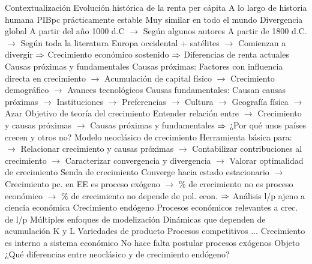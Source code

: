 \documentclass{nuevotema}
\begin{document}
\esquemalargo
















\begin{esquemal}
	\1[] 
		\2 Contextualización
			\3 Evolución histórica de la renta per cápita
				\4 A lo largo de historia humana
				\4[] PIBpc prácticamente estable
				\4[] Muy similar en todo el mundo
				\4 Divergencia global
				\4[] A partir del año 1000 d.C
				\4[] $\to$ Según algunos autores
				\4[] A partir de 1800 d.C.
				\4[] $\to$ Según toda la literatura
				\4[] Europa occidental + satélites
				\4[] $\to$ Comienzan a divergir
				\4[] $\Rightarrow$ Crecimiento económico sostenido
				\4[] $\Rightarrow$ Diferencias de renta actuales
			\3 Causas próximas y fundamentales
				\4 Causas próximas:
				\4[] Factores con influencia directa en crecimiento
				\4[] $\to$ Acumulación de capital físico
				\4[] $\to$ Crecimiento demográfico
				\4[] $\to$ Avances tecnológicos
				\4 Causas fundamentales:
				\4[] Causan causas próximas
				\4[] $\to$ Instituciones
				\4[] $\to$ Preferencias
				\4[] $\to$ Cultura
				\4[] $\to$ Geografía física
				\4[] $\to$ Azar
				\4 Objetivo de teoría del crecimiento
				\4[] Entender relación entre
				\4[] $\to$ Crecimiento y causas próximas
				\4[] $\to$ Causas próximas y fundamentales
				\4[] $\Rightarrow$ ¿Por qué unos países crecen y otros no?
			\3 Modelo neoclásico de crecimiento
				\4 Herramienta básica para:
				\4[] $\to$ Relacionar crecimiento y causas próximas
				\4[] $\to$ Contabilizar contribuciones al crecimiento
				\4[] $\to$ Caracterizar convergencia y divergencia
				\4[] $\to$ Valorar optimalidad de crecimiento
				\4 Senda de crecimiento
				\4[] Converge hacia estado estacionario
				\4[] $\to$ Crecimiento pc. en EE es proceso exógeno
				\4[] $\to$ \% de crecimiento no es proceso económico
				\4[] $\to$ \% de crecimiento no depende de pol. econ.
				\4[] $\Rightarrow$ Análisis l/p ajeno a ciencia económica
			\3 Crecimiento endógeno
				\4 Procesos económicos relevantes a crec. de l/p
				\4 Múltiples enfoques de modelización
				\4[] Dinámicas que dependen de acumulación K y L
				\4[] Variedades de producto
				\4[] Procesos competitivos
				\4[] ...
				\4 Crecimiento es interno a sistema económico
				\4[] No hace falta postular procesos exógenos
		\2 Objeto
			\3 ¿Qué diferencias entre neoclásico y de crecimiento endógeno?

\end{esquemal}
\end{document}
